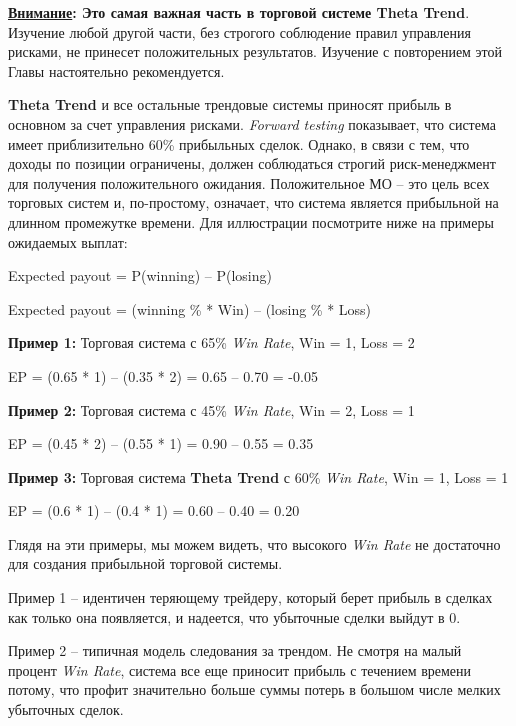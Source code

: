 \documentclass[12pt,DIV=18]{scrartcl}
\begin{document}
\textbf{\ul{Внимание}: Это самая важная часть в торговой системе Theta Trend}. Изучение любой другой части, без строгого соблюдение правил управления рисками, не принесет положительных результатов. Изучение с повторением этой Главы настоятельно рекомендуется.
 
\bigskip
 
\textbf{Theta Trend} и все остальные трендовые системы приносят прибыль в основном за счет управления рисками. \textit{Forward  testing} показывает, что система имеет приблизительно 60\% прибыльных сделок. Однако, в связи с тем, что доходы по позиции ограничены, должен соблюдаться строгий риск-менеджмент для получения положительного ожидания. Положительное МО -- это цель всех торговых систем и, по-простому, означает, что система является прибыльной на длинном промежутке времени. Для иллюстрации посмотрите ниже на примеры ожидаемых выплат:
 
\bigskip
 
\setlength{\parindent}{0.5cm}
Expected payout = P(winning) -- P(losing)\par
Expected payout = (winning \% * Win) -- (losing \% * Loss)\par
\bigskip
\textbf{Пример 1:} Торговая система с 65\% \textit{Win Rate}, Win = 1, Loss = 2\par
\bigskip
EP = (0.65 * 1) -- (0.35 * 2) = 0.65 -- 0.70 = -0.05\par
\bigskip
\textbf{Пример 2:} Торговая система с 45\% \textit{Win Rate}, Win = 2, Loss = 1\par
\bigskip
EP = (0.45 * 2) -- (0.55 * 1) = 0.90 -- 0.55 = 0.35\par
\bigskip
\textbf{Пример 3:} Торговая система \textbf{Theta Trend} с 60\% \textit{Win Rate}, Win = 1, Loss = 1\par
\bigskip
EP = (0.6 * 1) -- (0.4 * 1) = 0.60 -- 0.40 = 0.20\par

\bigskip

Глядя на эти примеры, мы можем видеть, что высокого \textit{Win Rate} не достаточно для создания прибыльной торговой системы.
 
\bigskip
 
Пример 1 -- идентичен теряющему трейдеру, который берет прибыль в сделках как только она появляется, и надеется, что убыточные сделки выйдут в 0.

\bigskip
 
Пример 2 -- типичная модель следования за трендом. Не смотря на малый процент \textit{Win Rate}, система все еще приносит прибыль с течением времени потому, что профит значительно больше суммы потерь в большом числе мелких убыточных сделок.
\end{document}
